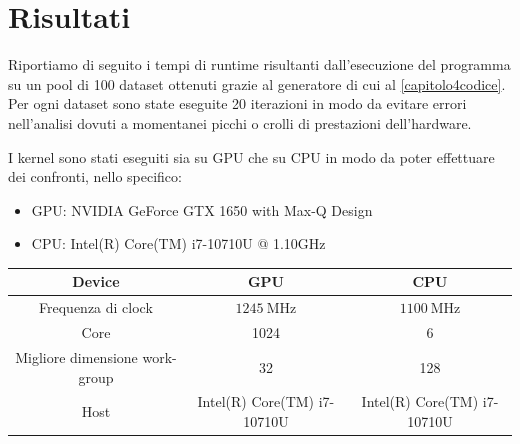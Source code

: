 \chapter{Risultati}\label{capitolo5risultati}
\vspace{4cm}

Riportiamo di seguito i tempi di runtime risultanti dall'esecuzione del programma su un pool di 100 dataset ottenuti grazie al generatore di cui al \autoref{capitolo4codice}. Per ogni dataset sono state eseguite 20 iterazioni in modo da evitare errori nell'analisi dovuti a momentanei picchi o crolli di prestazioni dell'hardware.

I kernel sono stati eseguiti sia su GPU che su CPU in modo da poter effettuare dei confronti, nello specifico:
\begin{itemize}
	\item{GPU: NVIDIA GeForce GTX 1650 with Max-Q Design}
	\item{CPU: Intel(R) Core(TM) i7-10710U @ 1.10GHz}
\end{itemize}

\begin{center}
\begin{scriptsize}
\bgroup
\def\arraystretch{1.5}
\begin{tabular}{|c|c|c|}
	\hline
	Device & \textbf{GPU} & \textbf{CPU} \\
	\hline
	Frequenza di clock & $\SI{1245}{\mega\hertz}$ & $\SI{1100}{\mega\hertz}$ \\
	\hline
	Core & 1024 & 6 \\
	\hline
	Migliore dimensione work-group & 32 & 128 \\
	\hline
	Host & Intel(R) Core(TM) i7-10710U & Intel(R) Core(TM) i7-10710U\\
	\hline
\end{tabular}
\egroup
\vspace{10pt}
\end{scriptsize}
\end{center}


